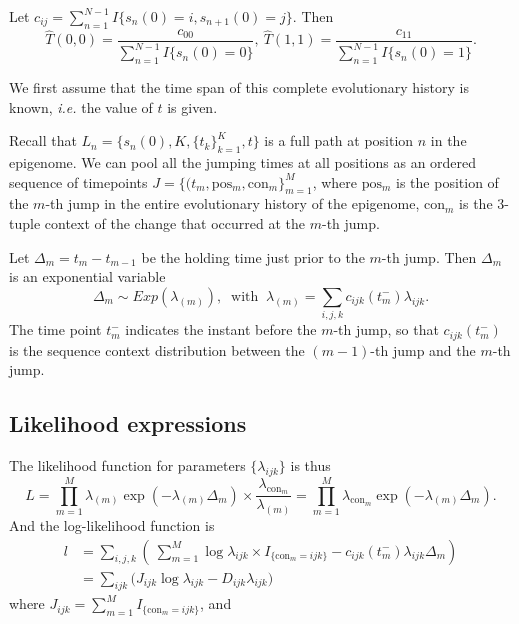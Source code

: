 \documentclass[11pt]{article}
\newcommand{\context}{\ensuremath{\mathrm{con}}}
\newcommand{\psn}{\ensuremath{\mathrm{pos}}}
\begin{document}
Let $c_{ij} = \sum_{n=1}^{N-1}I\{s_n(0) =i, s_{n+1}(0)=j\}$. Then
\[
\hat{T}(0, 0) = \frac{c_{00}}{\sum_{n=1}^{N-1}I\{s_n(0) = 0\}}, ~
\hat{T}(1,1) = \frac{c_{11}}{\sum_{n=1}^{N-1}I\{s_n(0) = 1\}}.
\]

We first assume that the time span of this complete evolutionary
history is known, \textit{i.e.} the value of $t$ is given.

Recall that $L_n = \{s_n(0), K, \{t_k\}_{k=1}^K, t\}$ is a full path
at position $n$ in the epigenome. We can pool all the jumping times at
all positions as an ordered sequence of timepoints $J = \{(t_m, \psn{}_m,
\context{}_m\}_{m=1}^{M}$, where $\psn{}_m$ is the position of the
$m$-th jump in the entire evolutionary history of the epigenome,
$\context{}_m$ is the 3-tuple context of the change that
occurred at the $m$-th jump.

Let $\Delta_m = t_m - t_{m-1}$ be the holding time just prior to the
$m$-th jump. Then $\Delta_m$ is an exponential variable
\[
\Delta_m \sim \mathit{Exp}(\lambda_{(m)}), ~\text{ with }~
\lambda_{(m)} = \sum_{i,j,k}c_{ijk}(t_m^-)\lambda_{ijk}.
\]
The time point $t_m^-$ indicates the instant before the $m$-th jump,
so that $c_{ijk}(t_m^-)$ is the sequence context distribution between
the $(m-1)$-th jump and the $m$-th jump.

\subsection{Likelihood expressions}

The likelihood function for parameters $\{\lambda_{ijk}\}$ is thus
\begin{equation}\label{eqn:lik}
  L = \prod\limits_{m=1}^{M} \lambda_{(m)} \exp(-\lambda_{(m)}\Delta_m) \times \frac{\lambda_{\context{}_m}}{\lambda_{(m)}}
  =\prod\limits_{m=1}^{M}\lambda_{\context{}_m}\exp(-\lambda_{(m)}\Delta_m).
\end{equation}
And the log-likelihood function is
\begin{equation}\label{eqn:loglik1}
  \begin{aligned}
    l & = \sum_{i,j,k} \left(~
      \sum_{m=1}^M\log\lambda_{ijk}\times I_{\{\context{}_m = ijk\}} - c_{ijk}(t_m^-)\lambda_{ijk}\Delta_m\right) \\
    & = \sum\limits_{ijk} \big(J_{ijk}\log\lambda_{ijk} - D_{ijk}\lambda_{ijk} \big)
  \end{aligned}
\end{equation}
where $J_{ijk} = \sum_{m=1}^M I_{\{\context{}_m = ijk\}}$, and
\end{document}
